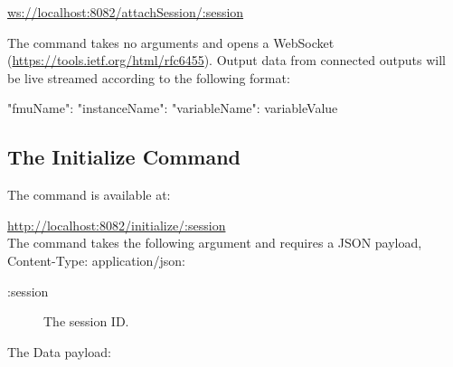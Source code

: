 \url{ws://localhost:8082/attachSession/:session}

\noindent The command takes no arguments and opens a WebSocket (\url{https://tools.ietf.org/html/rfc6455}). Output data from connected outputs will be live streamed according to the following format: 
%
%
%
\begin{json}
	{
		"{fmuName}":{
			"instanceName":{
				"variableName": variableValue
			}
		}
	}
\end{json}
%
%
%
%
%
%
%
\subsection{The Initialize Command}\label{sec:initcmd}
The command is available at:

\url{http://localhost:8082/initialize/:session}\\

\noindent The command takes the following argument and requires a JSON payload, Content-Type: application/json:

\begin{description}
	\item[:session] The session ID.
\end{description}

\noindent The Data payload:

